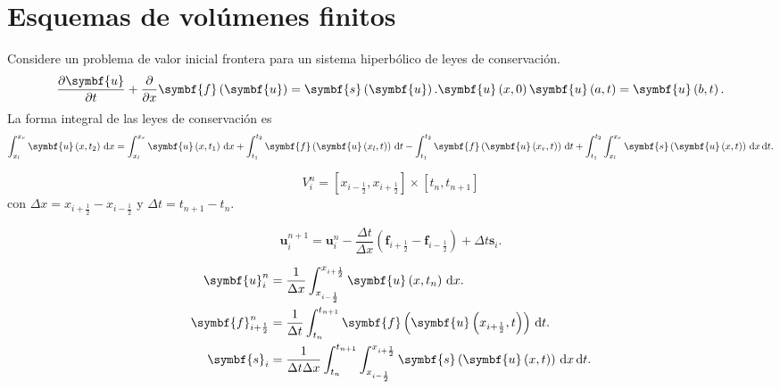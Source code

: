 \chapter{Esquemas de volúmenes finitos}

Considere un problema de valor inicial frontera para un sistema
hiperbólico de leyes de conservación.
\begin{equation*}
	\diffp{\symbf{u}}{t}+
	\diffp{}{x}
	\symbf{f}\left(\symbf{u}\right)=
	\symbf{s}\left(\symbf{u}\right).
	\symbf{u}\left(x,0\right)
	\symbf{u}\left(a,t\right)=
	\symbf{u}\left(b,t\right).
\end{equation*}
La forma integral de las leyes de conservación es
\begin{equation*}
	\int_{x_{l}}^{x_{r}}
	\symbf{u}\left(x,t_{2}\right)\dl x=
	\int_{x_{l}}^{x_{r}}
	\symbf{u}\left(x,t_{1}\right)\dl x+
	\int_{t_{1}}^{t_{2}}
	\symbf{f}\left(\symbf{u}\left(x_{l},t\right)\right)\dl t-
	\int_{t_{1}}^{t_{2}}
	\symbf{f}\left(\symbf{u}\left(x_{r},t\right)\right)\dl t+
	\int_{t_{1}}^{t_{2}}
	\int_{x_{l}}^{x_{r}}
	\symbf{s}\left(\symbf{u}\left(x,t\right)\right)\dl x\dl t.
\end{equation*}

\begin{equation*}
	V^{n}_{i}=
	\left[x_{i-\frac{1}{2}},x_{i+\frac{1}{2}}\right]\times
	\left[t_{n},t_{n+1}\right]
\end{equation*}
con $\Delta x=x_{i+\frac{1}{2}}-x_{i-\frac{1}{2}}$ y $\Delta t=t_{n+1}-t_{n}$.

\begin{equation*}
	\symbf{u}^{n+1}_{i}=
	\symbf{u}^{n}_{i}-
	\frac{\Delta t}{\Delta x}
	\left(\symbf{f}_{i+\frac{1}{2}}-\symbf{f}_{i-\frac{1}{2}}\right)+
	\Delta t\symbf{s}_{i}.
\end{equation*}

\begin{align*}
	\symbf{u}^{n}_{i}             & =
	\frac{1}{\Delta x}
	\int_{x_{i-\frac{1}{2}}}^{x_{i+\frac{1}{2}}}
	\symbf{u}\left(x,t_{n}\right)\dl x.                                   \\
	\symbf{f}^{n}_{i+\frac{1}{2}} & =
	\frac{1}{\Delta t}
	\int_{t_{n}}^{t_{n+1}}
	\symbf{f}\left(\symbf{u}\left(x_{i+\frac{1}{2}},t\right)\right)\dl t. \\
	\symbf{s}_{i}                 & =
	\frac{1}{\Delta t\Delta x}
	\int_{t_{n}}^{t_{n+1}}
	\int_{x_{i-\frac{1}{2}}}^{x_{i+\frac{1}{2}}}
	\symbf{s}\left(\symbf{u}\left(x,t\right)\right)\dl x\dl t.            \\
\end{align*}

